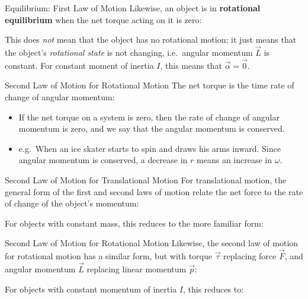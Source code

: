 \documentclass[12pt,compress,aspectratio=169]{beamer}
\begin{document}
\begin{frame}{Equilibrium: First Law of Motion}
  Likewise, an object is in \textbf{rotational equilibrium} when the net torque
  acting on it is zero:

  
  This does \emph{not} mean that the object has no rotational motion; it just
  means that the object's \emph{rotational state} is not changing, i.e.\
  angular momentum $\vec L$ is constant. For constant moment of inertia $I$,
  this means that $\vec\alpha=\vec 0$.
\end{frame}



\begin{frame}{Second Law of Motion for Rotational Motion}
  The net torque is the time rate of change of angular momentum:

  \begin{itemize}
  \item If the net torque on a system is zero, then the rate of change
    of angular momentum is zero, and we say that the angular momentum is
    conserved. 
  \item e.g.\ When an ice skater starts to spin and draws his arms inward.
    Since angular momentum is conserved, a decrease in $r$ means an
    increase in $\omega$.
  \end{itemize}
\end{frame}



\begin{frame}{Second Law of Motion for Translational Motion}
  For translational motion, the general form of the first and second laws of
  motion relate the net force to the rate of change of the object's momentum:


  For objects with constant mass, this reduces to the more familiar form:

\end{frame}



\begin{frame}{Second Law of Motion for Rotational Motion}
  Likewise, the second law of motion for rotational motion has a similar form,
  but with torque $\vec\tau$ replacing force $\vec F$, and angular momentum
  $\vec L$ replacing linear momentum $\vec p$:


  For objects with constant momentum of inertia $I$, this reduces to:

\end{frame}
\end{document}
